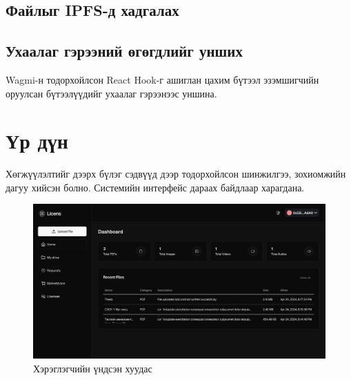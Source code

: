 


\subsection{Файлыг IPFS-д хадгалах}


\subsection{Ухаалаг гэрээний өгөгдлийг унших}
Wagmi-н тодорхойлсон React Hook-г ашиглан цахим бүтээл эзэмшигчийн оруулсан бүтээлүүдийг ухаалаг гэрээнээс уншина.



\newpage
\section{Үр дүн}
Хөгжүүлэлтийг дээрх бүлэг сэдвүүд дээр тодорхойлсон шинжилгээ, зохиомжийн дагуу хийсэн болно. Системийн интерфейс дараах байдлаар харагдана.

\begin{figure}[h!]
	\centering
	\includegraphics[scale=0.15]{src/images/dashboard.png}
	\caption{Хэрэглэгчийн үндсэн хуудас}
\end{figure}

